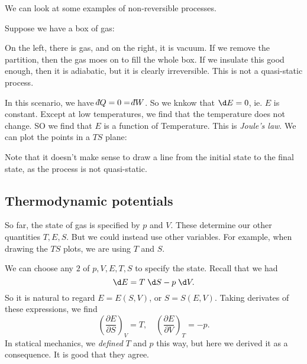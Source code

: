 \documentclass[a4paper]{article}
\def\di{{\mathchar'26\mkern-12mu d}}
\begin{document}
We can look at some examples of non-reversible processes.
\begin{eg}
  Suppose we have a box of gas:
  \begin{center}
  \end{center}
  On the left, there is gas, and on the right, it is vacuum. If we remove the partition, then the gas moes on to fill the whole box. If we insulate this good enough, then it is adiabatic, but it is clearly irreversible. This is not a quasi-static process.

  In this scenario, we have $\di Q = 0 = \di W$. So we knkow that $\d E = 0$, ie. $E$ is constant. Except at low temperatures, we find that the temperature does not change. SO we find that $E$ is a function of Temperature. This is \emph{Joule's law}. We can plot the points in a $TS$ plane:
  \begin{center}
  \end{center}
  Note that it doesn't make sense to draw a line from the initial state to the final state, as the process is not quasi-static.
\end{eg}

\subsection{Thermodynamic potentials}
So far, the state of gas is specified by $p$ and $V$. These determine our other quantities $T, E, S$. But we could instead use other variables. For example, when drawing the $TS$ plots, we are using $T$ and $S$.

We can choose any $2$ of $p, V, E, T, S$ to specify the state. Recall that we had
\[
  \d E = T \;\d S - p \;\d V.
\]
So it is natural to regard $E = E(S, V)$, or $S = S(E, V)$. Taking derivates of these expressions, we find
\[
  \left(\frac{\partial E}{\partial S}\right)_V = T,\quad \left(\frac{\partial E}{\partial V}\right)_T = -p.
\]
In statical mechanics, we \emph{defined} $T$ and $p$ this way, but here we derived it as a consequence. It is good that they agree.
\end{document}
